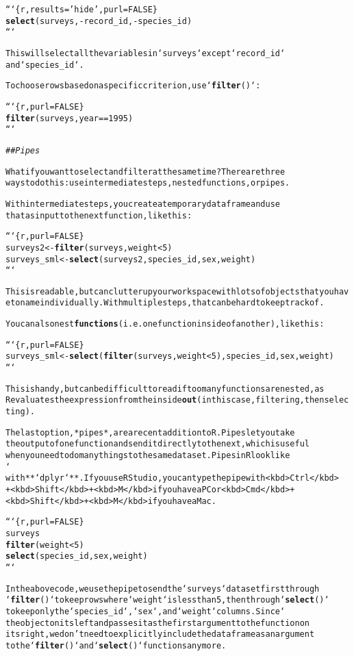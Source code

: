 \documentclass{article}\usepackage[]{graphicx}\usepackage[]{xcolor}
\makeatletter
\newcommand{\hlstr}[1]{\textcolor[rgb]{0.192,0.494,0.8}{#1}}%
\newcommand{\hlcom}[1]{\textcolor[rgb]{0.678,0.584,0.686}{\textit{#1}}}%
\newcommand{\hlkwd}[1]{\textcolor[rgb]{0.737,0.353,0.396}{\textbf{#1}}}%
\newenvironment{kframe}{%
 \def\at@end@of@kframe{}%
 \ifinner\ifhmode%
  \def\at@end@of@kframe{\end{minipage}}%
  \begin{minipage}{\columnwidth}%
 \fi\fi%
 \def\FrameCommand##1{\hskip\@totalleftmargin \hskip-\fboxsep
 \colorbox{shadecolor}{##1}\hskip-\fboxsep
     \hskip-\linewidth \hskip-\@totalleftmargin \hskip\columnwidth}%
 \MakeFramed {\advance\hsize-\width
   \@totalleftmargin\z@ \linewidth\hsize
   \@setminipage}}%
 {\par\unskip\endMakeFramed%
 \at@end@of@kframe}
\newenvironment{knitrout}{}{} %
\makeatother
\begin{document}
\begin{knitrout}
\begin{kframe}
\begin{alltt}
```\{r, results = \hlstr{'hide'}, purl = FALSE\}
\hlkwd{select}(surveys, -record_id, -species_id)
```

This will select all the variables in `surveys` except `record_id`
and `species_id`.

To choose rows based on a specific criterion, use `\hlkwd{filter}()`:

```\{r, purl = FALSE\}
\hlkwd{filter}(surveys, year == 1995)
```

\hlcom{## Pipes}

What if you want to select and filter at the same time? There are three
ways to do this: use intermediate steps, nested functions, or pipes.

With intermediate steps, you create a temporary data frame and use
that as input to the next function, like this:

```\{r, purl = FALSE\}
surveys2 <- \hlkwd{filter}(surveys, weight < 5)
surveys_sml <- \hlkwd{select}(surveys2, species_id, sex, weight)
```

This is readable, but can clutter up your workspace with lots of objects that you have to name individually. With multiple steps, that can be hard to keep track of.

You can also nest \hlkwd{functions} (i.e. one function inside of another), like this:

```\{r, purl = FALSE\}
surveys_sml <- \hlkwd{select}(\hlkwd{filter}(surveys, weight < 5), species_id, sex, weight)
```

This is handy, but can be difficult to read if too many functions are nested, as
R evaluates the expression from the inside \hlkwd{out} (in this case, filtering, then selecting).

The last option, *pipes*, are a recent addition to R. Pipes let you take
the output of one function and send it directly to the next, which is useful
when you need to do many things to the same dataset.  Pipes in R look like
`%>%` and are made available via the **`magrittr`** package, installed automatically
with **`dplyr`**. If you use RStudio, you can type the pipe with <kbd>Ctrl</kbd>
+ <kbd>Shift</kbd> + <kbd>M</kbd> if you have a PC or <kbd>Cmd</kbd> +
<kbd>Shift</kbd> + <kbd>M</kbd> if you have a Mac.

```\{r, purl = FALSE\}
surveys %>%
  \hlkwd{filter}(weight < 5) %>%
  \hlkwd{select}(species_id, sex, weight)
```

In the above code, we use the pipe to send the `surveys` dataset first through
`\hlkwd{filter}()` to keep rows where `weight` is less than 5, then through `\hlkwd{select}()`
to keep only the `species_id`, `sex`, and `weight` columns. Since `%>%` takes
the object on its left and passes it as the first argument to the function on
its right, we don't need to explicitly include the data frame as an argument
to the `\hlkwd{filter}()` and `\hlkwd{select}()` functions any more.


\end{alltt}
\end{kframe}
\end{knitrout}
\end{document}
